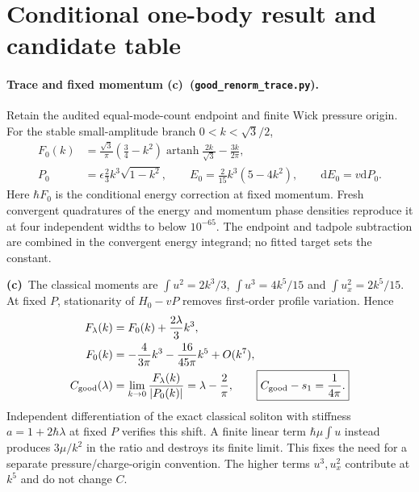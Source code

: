 \documentclass[11pt,a4paper]{article}
\newcommand{\C}{\textbf{(c)}\ }
\newcommand{\dd}{\mathrm d}
\newcommand{\file}[1]{\nolinkurl{#1}}
\newcommand{\trc}{\file{good_renorm_trace.py}}
\begin{document}
\section{Conditional one-body result and candidate table}
\paragraph{Trace and fixed momentum \C (\trc).}
Retain the audited equal-mode-count endpoint and finite Wick pressure
origin. For the stable small-amplitude branch $0<k<\sqrt3/2$,
\begin{align}
 F_0(k)&=\frac{\sqrt3}{\pi}(\tfrac34-k^2)
 \operatorname{artanh}\frac{2k}{\sqrt3}-\frac{3k}{2\pi},\\
 P_0&=\epsilon\frac23k^3\sqrt{1-k^2},\qquad
 E_0=\frac2{15}k^3(5-4k^2),\qquad \dd E_0=v\dd P_0.
\end{align}
Here $\hbar F_0$ is the conditional energy correction at fixed momentum.
Fresh convergent quadratures of the energy and momentum phase densities
reproduce it at four independent widths to below $10^{-65}$. The endpoint
and tadpole subtraction are combined in the convergent energy integrand;
no fitted target sets the constant.

\C The classical moments are $\int u^2=2k^3/3$,
$\int u^3=4k^5/15$ and $\int u_x^2=2k^5/15$.
At fixed $P$, stationarity of $H_0-vP$ removes first-order profile
variation. Hence
\begin{align}
 F_\lambda(k)&=F_0(k)+\frac{2\lambda}{3}k^3,\label{eq:Flambda}\\
 F_0(k)&=-\frac4{3\pi}k^3-\frac{16}{45\pi}k^5+O(k^7),\\
 C_{\rm good}(\lambda)&=\lim_{k\to0}\frac{F_\lambda(k)}{|P_0(k)|}
 =\lambda-\frac2\pi,\qquad
 \boxed{C_{\rm good}-s_1=\frac1{4\pi}.}\label{eq:C}
\end{align}
Independent differentiation of the exact classical soliton with stiffness
$a=1+2\hbar\lambda$ at fixed $P$ verifies this shift.
A finite linear term $\hbar\mu\int u$ instead produces $3\mu/k^2$ in the
ratio and destroys its finite limit. This fixes the need for a separate
pressure/charge-origin convention. The higher terms $u^3,u_x^2$ contribute
at $k^5$ and do not change $C$.
\end{document}
